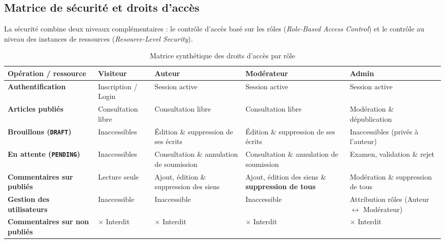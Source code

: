 \documentclass[11pt,a4paper]{article}
\begin{document}
\newpage

\subsection{Matrice de sécurité et droits d'accès}

La sécurité combine deux niveaux complémentaires : le contrôle d'accès basé sur les rôles (\textit{Role-Based Access Control}) et le contrôle au niveau des instances de ressources (\textit{Resource-Level Security}).

\begin{table}[htbp]
\centering
\scriptsize
\renewcommand{\arraystretch}{1.35}
\caption{Matrice synthétique des droits d'accès par rôle}
\label{tab:security-matrix}
\setlength{\arrayrulewidth}{0.4pt}
\begin{tabularx}{\textwidth}{|>{\bfseries}p{2.6cm}|p{1.9cm}|X|X|X|}
\hline
\rowcolor{gray!75}
\color{white}\textbf{Opération / ressource} & \color{white}\textbf{Visiteur} & \color{white}\textbf{Auteur} & \color{white}\textbf{Modérateur} & \color{white}\textbf{Admin} \\
\hline
\rowcolor{gray!10}
Authentification & Inscription / Login & Session active & Session active & Session active \\
\hline
Articles publiés & Consultation libre & Consultation libre & Consultation libre & Modération \& dépublication \\
\hline
\rowcolor{gray!10}
Brouillons (\texttt{DRAFT}) & Inaccessibles & Édition \& suppression de ses écrits & Édition \& suppression de ses écrits & Inaccessibles (privés à l'auteur) \\
\hline
En attente (\texttt{PENDING}) & Inaccessibles & Consultation \& annulation de soumission & Consultation \& annulation de soumission & Examen, validation \& rejet \\
\hline
\rowcolor{gray!10}
Commentaires sur publiés & Lecture seule & Ajout, édition \& suppression des siens & Ajout, édition des siens \& \textbf{suppression de tous} & Modération \& suppression de tous \\
\hline
Gestion des utilisateurs & Inaccessible & Inaccessible & Inaccessible & Attribution rôles (Auteur $\leftrightarrow$ Modérateur) \\
\hline
\rowcolor{gray!10}
Commentaires sur non publiés & \centering$\times$ Interdit & \centering$\times$ Interdit & \centering$\times$ Interdit & \centering\arraybackslash$\times$ Interdit \\
\hline
\end{tabularx}
\end{table}
\end{document}
